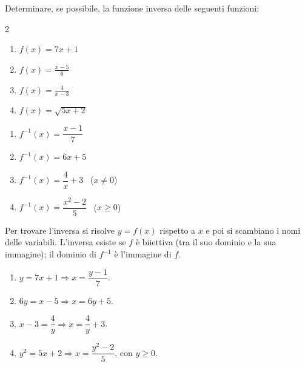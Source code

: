 \begin{question}[ID=4.5, subtitle={Funzione inversa — serie 5}, difficulty=media, tags={funzioni,inversa}]
Determinare, se possibile, la funzione inversa delle seguenti funzioni:

\begin{center}\begin{minipage}{0.92\linewidth}
\begin{multicols}{2}
\begin{enumerate}[leftmargin=3.2cm]
\item $f(x)=7x+1$
\item $f(x)=\frac{x-5}{6}$
\item $f(x)=\frac{4}{x-3}$
\item $f(x)=\sqrt{5x+2}$
\end{enumerate}
\end{multicols}
\end{minipage}\end{center}
\begin{solution}
\begin{enumerate}
    \item $f^{-1}(x)=\dfrac{x-1}{7}$
    \item $f^{-1}(x)=6x+5$
    \item $f^{-1}(x)=\dfrac4x+3$ \ ($x\neq0$)
    \item $f^{-1}(x)=\dfrac{x^2-2}{5}$ \ ($x\geq0$)
\end{enumerate}
\end{solution}
\begin{explanation}
Per trovare l'inversa si risolve $y=f(x)$ rispetto a $x$ e poi si scambiano i nomi delle variabili. L'inversa esiste se $f$ è biiettiva (tra il suo dominio e la sua immagine); il dominio di $f^{-1}$ è l'immagine di $f$.
\begin{enumerate}
    \item $y=7x+1 \Rightarrow x=\dfrac{y-1}{7}$.
    \item $6y=x-5 \Rightarrow x=6y+5$.
    \item $x-3=\dfrac4y \Rightarrow x=\dfrac4y+3$.
    \item $y^2=5x+2 \Rightarrow x=\dfrac{y^2-2}{5}$, con $y\geq0$.
\end{enumerate}
\end{explanation}

\end{question}


